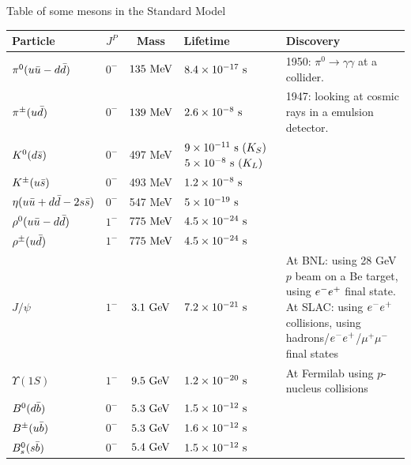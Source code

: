 \begin{table}
\begin{center}
Table of some mesons in the Standard Model \\
\def\arraystretch{1.5}
\begin{tabular}{|l||c|c|p{}|p{}|}
\hline
Particle & $J^P$ & Mass & Lifetime & Discovery\\
\hline
\hline
$\pi^0 (u\bar{u}-d\bar{d})$ & $0^-$ & $135~\text{MeV}$ & $8.4\times 10^{-17}~\text{s}$ & 1950: $\pi^0\rightarrow\gamma\gamma$ at a collider. \\ \hline
$\pi^\pm (u\bar{d})$ & $0^-$  & $139~\text{MeV}$ & $2.6 \times 10^{-8}~\text{s}$ & 1947: looking at cosmic rays in a emulsion detector. \\ \hline
$K^0(d\bar{s})$ & $0^-$  & 497 MeV & $9\times 10^{-11}~\text{s}~(K_S)$\newline$5\times 10^{-8}~\text{s}~(K_L)$ &  \\ \hline
$K^\pm(u\bar{s})$ & $0^-$  & 493 MeV & $1.2\times 10^{-8}~\text{s}$ & \\ \hline
$\eta(u\bar{u}+d\bar{d}-2s\bar{s})$ & $0^-$  &547 MeV& $5\times 10^{-19}~\text{s}$ & \\ \hline
$\rho^0(u\bar{u}-d\bar{d})$ & $1^-$  &$775~\text{MeV}$&$4.5\times10^{-24}~\text{s}$& \\ \hline
$\rho^\pm(u\bar{d})$ & $1^-$  &$775~\text{MeV}$&$4.5\times10^{-24}~\text{s}$& \\ \hline
$J/\psi$ & $1^-$ &$3.1~\text{GeV}$&$7.2\times 10^{-21}~\text{s}$& At BNL: using 28 GeV $p$ beam on a Be target, using $e^{-}e^{+}$ final state. \newline At SLAC: using $e^{-}e^{+}$ collisions, using hadrons/$e^{-}e^{+}$/$\mu^+\mu^-$ final states\\ \hline
$\Upsilon(1S)$ & $1^-$ & $9.5~\text{GeV}$ &$1.2\times10^{-20}~\text{s}$& At Fermilab using $p$-nucleus collisions \\ \hline
$B^0(d\bar{b})$ & $0^-$ & $5.3~\text{GeV}$ &$1.5\times 10^{-12}~\text{s}$&  \\ \hline
$B^\pm(u\bar{b})$ & $0^-$ & $5.3~\text{GeV}$ &$1.6\times10^{-12}~\text{s}$&  \\ \hline
$B^0_s(s\bar{b})$ & $0^-$ & $5.4~\text{GeV}$ &$1.5\times 10^{-12}~\text{s}$&  \\ \hline
\end{tabular}

\end{center}
\end{table}

\clearpage

